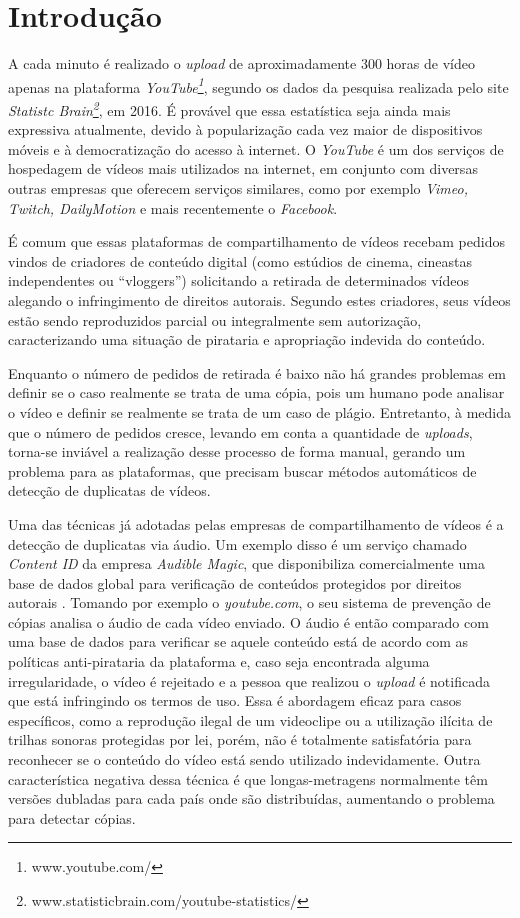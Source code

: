 \chapter{Introdução}
\label{chap:introducao}

A cada minuto é realizado o \textit{upload} de aproximadamente 300 horas de vídeo apenas na plataforma \textit{YouTube\footnote{www.youtube.com/}}, segundo os dados da pesquisa realizada pelo site \textit{Statistc Brain\footnote{www.statisticbrain.com/youtube-statistics/}}, em 2016. É provável que essa estatística seja ainda mais expressiva atualmente, devido à popularização cada vez maior de dispositivos móveis e à democratização do acesso à internet. O \textit{YouTube} é um dos serviços de hospedagem de vídeos mais utilizados na internet, em conjunto com diversas outras empresas que oferecem serviços similares, como por exemplo \textit{Vimeo, Twitch, DailyMotion} e mais recentemente o \textit{Facebook}.

É comum que essas plataformas de compartilhamento de vídeos recebam pedidos vindos de criadores de conteúdo digital (como estúdios de cinema, cineastas independentes ou ``vloggers'') solicitando a retirada de determinados vídeos alegando o infringimento de direitos autorais. Segundo estes criadores, seus vídeos estão sendo reproduzidos parcial ou integralmente sem autorização, caracterizando uma situação de pirataria e apropriação indevida do conteúdo. 

Enquanto o número de pedidos de retirada é baixo não há grandes problemas em definir se o caso realmente se trata de uma cópia, pois um humano pode analisar o vídeo e definir se realmente se trata de um caso de plágio. Entretanto, à medida que o número de pedidos cresce, levando em conta a quantidade de \textit{uploads}, torna-se inviável a realização desse processo de forma manual, gerando um problema para as plataformas, que precisam buscar métodos automáticos de detecção de duplicatas de vídeos.

Uma das técnicas já adotadas pelas empresas de compartilhamento de vídeos é a detecção de duplicatas via áudio. Um exemplo disso é um serviço chamado \textit{Content ID} da empresa \textit{Audible Magic}, que disponibiliza comercialmente uma base de dados global para verificação de conteúdos protegidos por direitos autorais \citeauthor{audiblemagic}. Tomando por exemplo o \textit{youtube.com}, o seu sistema de prevenção de cópias analisa o áudio de cada vídeo enviado. O áudio é então comparado com uma base de dados para verificar se aquele conteúdo está de acordo com as políticas anti-pirataria da plataforma e, caso seja encontrada alguma irregularidade, o vídeo é rejeitado e a pessoa que realizou o \textit{upload} é notificada que está infringindo os termos de uso. Essa é abordagem eficaz para casos específicos, como a reprodução ilegal de um videoclipe ou a utilização ilícita de trilhas sonoras protegidas por lei, porém, não é totalmente satisfatória para reconhecer se o conteúdo do vídeo está sendo utilizado indevidamente. Outra característica negativa dessa técnica é que longas-metragens normalmente têm versões dubladas para cada país onde são distribuídas, aumentando o problema para detectar cópias.

